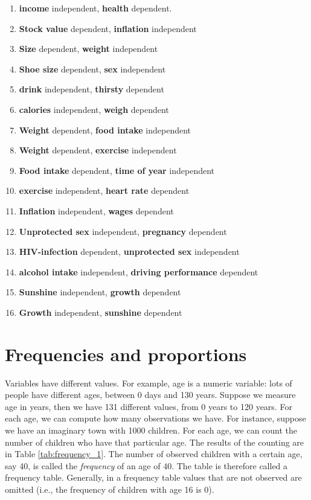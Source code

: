 \documentclass[]{report}\usepackage[]{graphicx}\usepackage[]{color}
\begin{document}
\begin{enumerate}

\item \textbf{income} independent, \textbf{health} dependent.
\item \textbf{Stock value} dependent, \textbf{inflation} independent
\item \textbf{Size} dependent, \textbf{weight} independent
\item \textbf{Shoe size} dependent, \textbf{sex} independent
\item \textbf{drink} independent, \textbf{thirsty} dependent
\item \textbf{calories} independent, \textbf{weigh} dependent
\item \textbf{Weight} dependent, \textbf{food intake} independent
\item \textbf{Weight} dependent, \textbf{exercise} independent
\item \textbf{Food intake} dependent, \textbf{time of year} independent
\item \textbf{exercise} independent, \textbf{heart rate} dependent
\item \textbf{Inflation} independent, \textbf{wages} dependent
\item \textbf{Unprotected sex} independent, \textbf{pregnancy} dependent
\item \textbf{HIV-infection} dependent, \textbf{unprotected sex} independent
\item \textbf{alcohol intake} independent, \textbf{driving performance} dependent
\item \textbf{Sunshine} independent, \textbf{growth} dependent
\item \textbf{Growth} independent, \textbf{sunshine} dependent

\end{enumerate}


\section{Frequencies and proportions}

Variables have different values. For example, age is a numeric variable: lots of people have different ages, between 0 days and 130 years. Suppose we measure age in years, then we have 131 different values, from 0 years to 120 years. For each age, we can compute how many observations we have. For instance, suppose we have an imaginary town with 1000 children. For each age, we can count the number of children who have that particular age. The results of the counting are in Table \ref{tab:frequency_1}. The number of observed children with a certain age, say 40, is called the \textit{frequency} of an age of 40. The table is therefore called a frequency table. Generally, in a frequency table values that are not observed are omitted (i.e., the frequency of children with age 16 is 0). 
\end{document}
